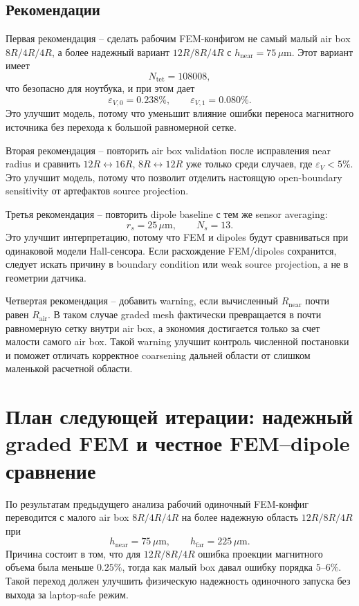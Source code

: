 \documentclass[12pt,a4paper]{article}
\begin{document}
\subsection*{Рекомендации}

Первая рекомендация -- сделать рабочим FEM-конфигом не самый малый air box
\(8R/4R/4R\), а более надежный вариант \(12R/8R/4R\) с
\(h_{\mathrm{near}}=75\,\mu\mathrm{m}\). Этот вариант имеет
\[
    N_{\mathrm{tet}}=108008,
\]
что безопасно для ноутбука, и при этом дает
\[
    \varepsilon_{V,0}=0.238\%,\qquad
    \varepsilon_{V,1}=0.080\%.
\]
Это улучшит модель, потому что уменьшит влияние ошибки переноса магнитного
источника без перехода к большой равномерной сетке.

Вторая рекомендация -- повторить air box validation после исправления near
radius и сравнить \(12R\leftrightarrow 16R\), \(8R\leftrightarrow 12R\) уже
только среди случаев, где \(\varepsilon_V<5\%\). Это улучшит модель, потому что
позволит отделить настоящую open-boundary sensitivity от артефактов source
projection.

Третья рекомендация -- повторить dipole baseline с тем же sensor averaging:
\[
    r_s=25\,\mu\mathrm{m},\qquad N_s=13.
\]
Это улучшит интерпретацию, потому что FEM и dipoles будут сравниваться при
одинаковой модели Hall-сенсора. Если расхождение FEM/dipoles сохранится,
следует искать причину в boundary condition или weak source projection, а не в
геометрии датчика.

Четвертая рекомендация -- добавить warning, если вычисленный
\(R_{\mathrm{near}}\) почти равен \(R_{\mathrm{air}}\). В таком случае graded
mesh фактически превращается в почти равномерную сетку внутри air box, а
экономия достигается только за счет малости самого air box. Такой warning
улучшит контроль численной постановки и поможет отличать корректное coarsening
дальней области от слишком маленькой расчетной области.

\section{План следующей итерации: надежный graded FEM и честное FEM--dipole сравнение}

По результатам предыдущего анализа рабочий одиночный FEM-конфиг переводится с
малого air box \(8R/4R/4R\) на более надежную область \(12R/8R/4R\) при
\[
    h_{\mathrm{near}}=75\,\mu\mathrm{m},\qquad
    h_{\mathrm{far}}=225\,\mu\mathrm{m}.
\]
Причина состоит в том, что для \(12R/8R/4R\) ошибка проекции магнитного объема
была меньше \(0.25\%\), тогда как малый box давал ошибку порядка \(5\text{--}6\%\).
Такой переход должен улучшить физическую надежность одиночного запуска без
выхода за laptop-safe режим.
\end{document}
